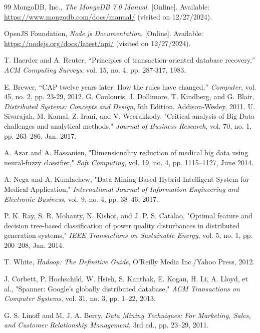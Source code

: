 \documentclass[../main.tex]{subfiles}
\begin{document}
\begin{thebibliography}{99}
 MongoDB, Inc., \textit{The MongoDB 7.0 Manual}. [Online]. Available: \url{https://www.mongodb.com/docs/manual/} (visited on 12/27/2024).

 OpenJS Foundation, \textit{Node.js Documentation}. [Online]. Available: \url{https://nodejs.org/docs/latest/api/} (visited on 12/27/2024).

 T. Haerder and A. Reuter, ``Principles of transaction-oriented database recovery,'' \textit{ACM Computing Surveys}, vol. 15, no. 4, pp. 287-317, 1983.

 E. Brewer, ``CAP twelve years later: How the rules have changed,'' \textit{Computer}, vol. 45, no. 2, pp. 23-29, 2012.
 G. Coulouris, J. Dollimore, T. Kindberg, and G. Blair, \textit{Distributed Systems: Concepts and Design}, 5th Edition. Addison-Wesley, 2011.
 U. Sivarajah, M. Kamal, Z. Irani, and V. Weerakkody, "Critical analysis of Big Data challenges and analytical methods," \textit{Journal of Business Research}, vol. 70, no. 1, pp. 263–286, Jan. 2017.

 A. Azar and A. Hassanien, "Dimensionality reduction of medical big data using neural-fuzzy classifier," \textit{Soft Computing}, vol. 19, no. 4, pp. 1115–1127, June 2014.

 A. Nega and A. Kumlachew, "Data Mining Based Hybrid Intelligent System for Medical Application," \textit{International Journal of Information Engineering and Electronic Business}, vol. 9, no. 4, pp. 38–46, 2017.

 P. K. Ray, S. R. Mohanty, N. Kishor, and J. P. S. Catalao, "Optimal feature and decision tree-based classification of power quality disturbances in distributed generation systems," \textit{IEEE Transactions on Sustainable Energy}, vol. 5, no. 1, pp. 200–208, Jan. 2014.

 T. White, \textit{Hadoop: The Definitive Guide}, O'Reilly Media Inc./Yahoo Press, 2012.

 J. Corbett, P. Hochschild, W. Hsieh, S. Kanthak, E. Kogan, H. Li, A. Lloyd, et al., "Spanner: Google’s globally distributed database," \textit{ACM Transactions on Computer Systems}, vol. 31, no. 3, pp. 1–22, 2013.

 G. S. Linoff and M. J. A. Berry, \textit{Data Mining Techniques: For Marketing, Sales, and Customer Relationship Management}, 3rd ed., pp. 23–29, 2011.


\end{thebibliography}
\end{document}
